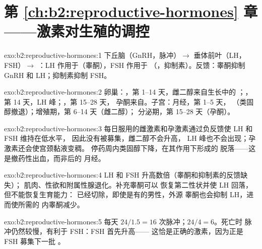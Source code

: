 \section*{第 \ref{ch:b2:reproductive-hormones} 章——激素对生殖的调控}

\begin{solution}{exo:b2:reproductive-hormones:1}
下丘脑（GnRH，脉冲）$\to$ 垂体前叶（LH，FSH）$\to$
：LH 作用于（睾酮），FSH 作用于
（，抑制素）。反馈：睾酮抑制 GnRH 和
LH；抑制素抑制 FSH。
\end{solution}

\begin{solution}{exo:b2:reproductive-hormones:2}
卵巢：，第 1--14 天，雌二醇来自生长中的
；，第 14 天，LH 峰；，第 15--28 天，
孕酮来自。子宫：月经，第 1--5 天，
（类固醇撤退）；增殖期，第 6--14 天（雌二醇）；
分泌期，第 15--28 天（孕酮）。
\end{solution}

\begin{solution}{exo:b2:reproductive-hormones:3}
每日服用的雌激素和孕激素通过负反馈使 LH 和 FSH 维持在低水平，
因此没有被募集，雌二醇不会升高，
LH 峰也不会出现；孕激素还会使宫颈黏液变稠。
停药周内类固醇下降，在其作用下形成的
脱落——这是撤药性出血，而非后的
月经。
\end{solution}

\begin{solution}{exo:b2:reproductive-hormones:4}
LH 和 FSH 升高数倍（睾酮和抑制素的反馈缺失）；
肌肉、性欲和附属性腺退化。补充睾酮可以
恢复第二性状并使 LH 回落，但不能恢复生育能力：
已经切除，即使是有的男性，外源
睾酮也会抑制 LH，进而使所需的
内睾酮减少。
\end{solution}

\begin{solution}{exo:b2:reproductive-hormones:5}
每天 $24/1.5 = 16$ 次脉冲；$24/4 = 6$。死亡时
脉冲仍然较慢，有利于 FSH：FSH 首先升高——
这恰是正确的激素，因为正是 FSH 募集下一批
。
\end{solution}


